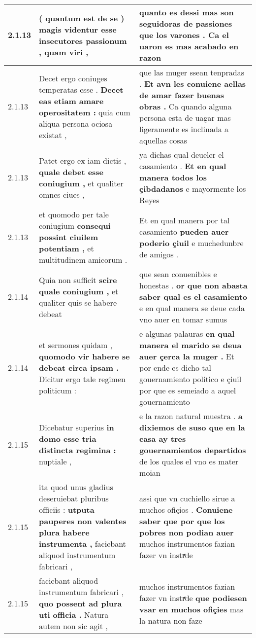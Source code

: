 \begin{tabular}{|p{1cm}|p{6.5cm}|p{6.5cm}|}
2.1.13 & ( quantum est de se ) \textbf{ magis videntur esse insecutores passionum , } quam viri , & quanto es dessi \textbf{ mas son seguidoras de passiones que los varones . } Ca el uaron es mas acabado en razon \\\hline
2.1.13 & Decet ergo coniuges temperatas esse . \textbf{ Decet eas etiam amare operositatem : } quia cum aliqua persona ociosa existat , & que las muger ssean tenpradas . \textbf{ Et avn les conuiene aellas de amar fazer buenas obras . } Ca quando alguna persona esta de uagar mas ligeramente es inclinada a aquellas cosas \\\hline
2.1.13 & Patet ergo ex iam dictis , \textbf{ quale debet esse coniugium , } et qualiter omnes ciues , & ya dichas qual deueler el casamiento . \textbf{ Et en qual manera todos los çibdadanos } e mayormente los Reyes \\\hline
2.1.13 & et quomodo per tale coniugium \textbf{ consequi possint ciuilem potentiam , } et multitudinem amicorum . & Et en qual manera por tal casamiento \textbf{ pueden auer poderio çiuil } e muchedunbre de amigos . \\\hline
2.1.14 & Quia non sufficit \textbf{ scire quale coniugium , } et qualiter quis se habere debeat & que sean conuenibles e honestas . \textbf{ or que non abasta saber qual es el casamiento } e en qual manera se deue cada vno auer en tomar sumus \\\hline
2.1.14 & et sermones quidam , \textbf{ quomodo vir habere se debeat circa ipsam . } Dicitur ergo tale regimen politicum : & e algunas palauras \textbf{ en qual manera el marido se deua auer çerca la muger . } Et por ende es dicho tal gouernamiento politico e çiuil por que es semeiado a aquel gouernamiento \\\hline
2.1.15 & Dicebatur superius \textbf{ in domo esse tria distincta regimina : } nuptiale , & e la razon natural muestra . \textbf{ a dixiemos de suso que en la casa ay tres gouernamientos departidos } de los quales el vno es mater moian \\\hline
2.1.15 & ita quod unus gladius deseruiebat pluribus officiis : \textbf{ utputa pauperes non valentes plura habere instrumenta , } faciebant aliquod instrumentum fabricari , & assi que vn cuchiello sirue a muchos ofiçios . \textbf{ Conuiene saber que por que los pobres non podian auer } muchos instrumentos fazian fazer vn instrͤde \\\hline
2.1.15 & faciebant aliquod instrumentum fabricari , \textbf{ quo possent ad plura uti officia . } Natura autem non sic agit , & muchos instrumentos fazian fazer vn instrͤde \textbf{ que podiesen vsar en muchos ofiçies } mas la natura non faze \\\hline

\end{tabular}
